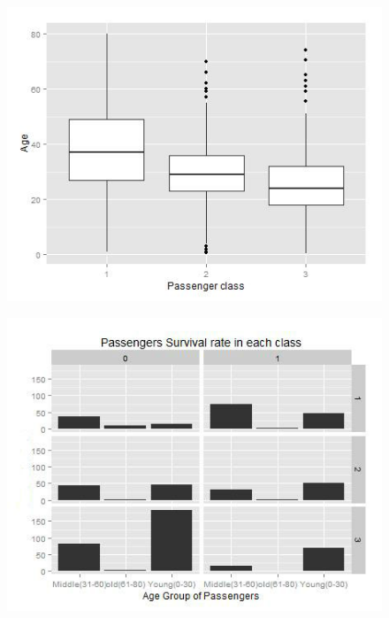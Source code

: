 \begin{figure}
\centering
\begin{minipage}{.5\textwidth}
  \includegraphics[width=1\linewidth]{figs/plot14}
  \label{fig:plot14}
\end{minipage}%
\begin{minipage}{.5\textwidth}
  \centering
  \includegraphics[width=1\linewidth]{figs/plot15}
  \label{fig:plot15}
\end{minipage}
\end{figure}

